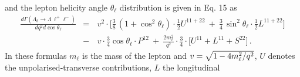 and the lepton helicity angle $\theta_\ell$ distribution is given in Eq. 15 as
\begin{eqnarray}
\label{costheta2}
\frac{d\Gamma(\Lambda_{b}\to \Lambda \,\ell^{+}\ell^{-})}{dq^2d\cos\theta_\ell} 
&=&\,
v^{2}\cdot\bigg[\frac{3}{8}\,(1+\cos^2\theta_\ell)\cdot
\frac{1}{2} U^{11+22}  
\ + \ \frac{3}{4}\,\sin^2\theta_\ell\cdot
\frac{1}{2} L^{11+22} \bigg]\label{distr2}\nonumber\\[2mm]
&-&\,v \cdot\frac{3}{4}\cos\theta_\ell\cdot P^{12} 
\ + \ \frac{2m_{\ell}^{2}}{q^{2}}\cdot \frac{3}{4}\cdot
\bigg[ U^{11}+ L^{11} + S^{22} \bigg]\,.
\end{eqnarray}
%
In these formulas $m_\ell$ is the mass of the lepton and $v = \sqrt{1-4m_\ell^2/q^2}$, $U$ denotes
the unpolarised-transverse contributions, $L$ the longitudinal
